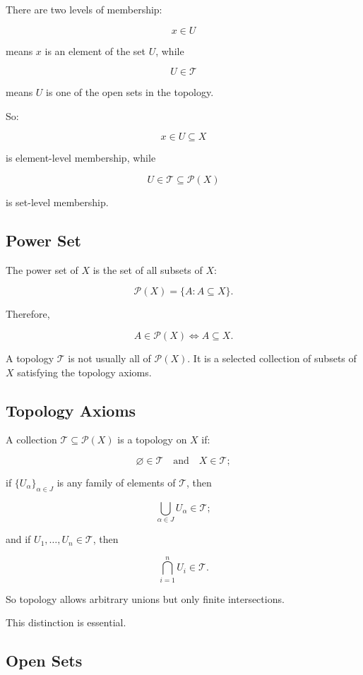 \documentclass{article}
\begin{document}
	There are two levels of membership:
	
	$$
	x\in U
	$$
	
	means \(x\) is an element of the set \(U\), while
	
	$$
	U\in\mathcal{T}
	$$
	
	means \(U\) is one of the open sets in the topology.
	
	So:
	
	$$
	x\in U\subseteq X
	$$
	
	is element-level membership, while
	
	$$
	U\in\mathcal{T}\subseteq\mathcal{P}(X)
	$$
	
	is set-level membership.
	
	\subsection{Power Set}
	
	The power set of \(X\) is the set of all subsets of \(X\):
	
	$$
	\mathcal{P}(X)=\{A:A\subseteq X\}.
	$$
	
	Therefore,
	
	$$
	A\in\mathcal{P}(X)
	\iff
	A\subseteq X.
	$$
	
	A topology \(\mathcal{T}\) is not usually all of \(\mathcal{P}(X)\). It is a selected collection of subsets of \(X\) satisfying the topology axioms.
	
	\subsection{Topology Axioms}
	
	A collection \(\mathcal{T}\subseteq\mathcal{P}(X)\) is a topology on \(X\) if:
	
	$$
	\varnothing\in\mathcal{T}
	\quad\text{and}\quad
	X\in\mathcal{T};
	$$
	
	if \(\{U_\alpha\}_{\alpha\in J}\) is any family of elements of \(\mathcal{T}\), then
	
	$$
	\bigcup_{\alpha\in J}U_\alpha\in\mathcal{T};
	$$
	
	and if \(U_1,\ldots,U_n\in\mathcal{T}\), then
	
	$$
	\bigcap_{i=1}^{n}U_i\in\mathcal{T}.
	$$
	
	So topology allows arbitrary unions but only finite intersections.
	
	This distinction is essential.
	
	\subsection{Open Sets}
	
\end{document}
